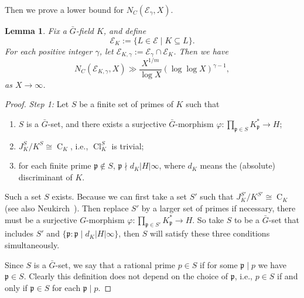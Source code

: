 \documentclass{amsart}
\numberwithin{equation}{section}
\theoremstyle{plain}
\newtheorem{lemma}[theorem]{Lemma}
\theoremstyle{definition}
\theoremstyle{remark}
\begin{document}
Then we prove a lower bound for $N_{C}(\mathcal{E}_{\gamma},X)$.
\begin{lemma}\label{lemma: estimate for lower bound}
	Fix a $\bar{G}$-field $K$, and define
	\begin{equation*}
		\mathcal{E}_K:=\{L\in\mathcal{E}\mid K\subseteq L\}.
	\end{equation*}
	For each positive integer $\gamma$, let $\mathcal{E}_{K,\gamma}:=\mathcal{E}_{\gamma}\cap\mathcal{E}_{K}$.
	Then we have
	\begin{equation*}
		N_C(\mathcal{E}_{K,\gamma},X)\gg \frac{X^{1/m}}{\log X}(\log\log X)^{\gamma-1},
	\end{equation*}
	as $X\to\infty$.
\end{lemma}
\begin{proof}
	\emph{Step 1:}
	Let $S$ be a finite set of primes of $K$ such that
	\begin{enumerate}
		\item $S$ is a $\bar{G}$-set, and there exists a surjective $\bar{G}$-morphism $\varphi:\prod_{\mathfrak{p}\in S}K_{\mathfrak{p}}^*\to H$;
		\item  $J_K^S/K^S\cong\operatorname{C}_K$, i.e., $\operatorname{Cl}_K^S$ is trivial;
		\item for each finite prime $\mathfrak{p}\notin S$, $\mathfrak{p}\nmid d_K\lvert H\rvert\infty$, where $d_K$ means the (absolute) discriminant of $K$.
	\end{enumerate}
	Such a set $S$ exists.
	Because we can first take a set $S'$ such that $J_K^{S'}/K^{S'}\cong\operatorname{C}_K$ (see also Neukirch~\cite[VI.1.4]{neukirch2013algebraic}).
	Then replace $S'$ by a larger set of primes if necessary, there must be a surjective $G$-morphism $\varphi:\prod_{\mathfrak{p}\in S'}K_{\mathfrak{p}}^*\to H$.
	So take $S$ to be a $\bar{G}$-set that includes $S'$ and $\{\mathfrak{p}:\mathfrak{p}\mid d_K\lvert H\rvert\infty\}$, then $S$ will satisfy these three conditions simultaneously.
	
	Since $S$ is a $\bar{G}$-set, we say that a rational prime $p\in S$ if for some $\mathfrak{p}\mid p$ we have $\mathfrak{p}\in S$.
	Clearly this definition does not depend on the choice of $\mathfrak{p}$, i.e., $p\in S$ if and only if $\mathfrak{p}\in S$ for each $\mathfrak{p}\mid p$.	
	

\end{proof}
\end{document}
